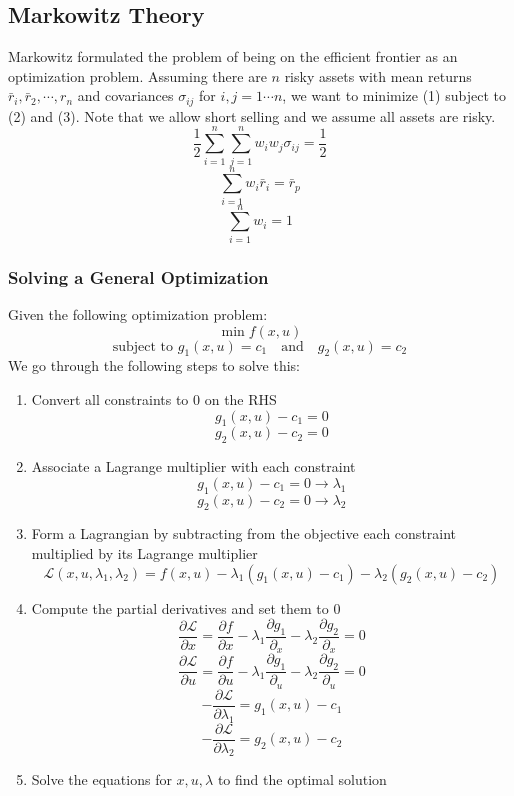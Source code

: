\documentclass[11pt]{article}
\newcommand{\Lagr}{\mathcal{L}}
\begin{document}
\subsection{Markowitz Theory}
Markowitz formulated the problem of being on the efficient frontier as an optimization problem. Assuming there are $n$ risky assets with mean returns $\bar{r}_i, \bar{r}_2, \cdots, r_n$ and covariances $\sigma_{ij}$ for $i,j = 1 \cdots n$, we want to minimize (1) subject to (2) and (3). Note that  we allow short selling and we assume all assets are risky.
\begin{equation}
 \frac{1}{2} \sum_{i=1}^n \sum_{j=1}^n w_iw_j \sigma_{ij} = \frac{1}{2}
\end{equation}
\begin{equation}
 \sum_{i=1}^n w_i\bar{r}_i = \bar{r}_p 
\end{equation}
\begin{equation}
 \sum_{i=1}^n w_i =1 
\end{equation}
\pagebreak
\subsubsection{Solving a General Optimization}
Given the following optimization problem:
$$ \min f(x,u)$$
$$ \text{subject to } g_1(x,u) = c_1 \quad \text{and} \quad g_2(x,u) = c_2 $$ 
We go through the following steps to solve this:
\begin{enumerate}
\item Convert all constraints to 0 on the RHS
$$ g_1(x,u) - c_1  = 0$$
$$ g_2(x,u) - c_2 = 0$$
\item Associate a Lagrange multiplier with each constraint
$$ g_1(x,u) - c_1  = 0 \rightarrow \lambda_1$$
$$ g_2(x,u) - c_2 = 0 \rightarrow \lambda_2$$
\item Form a Lagrangian by subtracting from the objective each constraint multiplied by its Lagrange multiplier
$$ \Lagr(x, u,\lambda_1, \lambda_2) = f(x,u) - \lambda_1(g_1(x,u) - c_1) - \lambda_2(g_2(x,u) - c_2)$$
\item Compute the partial derivatives and set them to 0
$$ \frac{\partial \Lagr}{\partial x} = \frac{\partial f}{\partial x } - \lambda_1 \frac{\partial g_1}{\partial _x} - \lambda_2 \frac{\partial g_2}{\partial _x} = 0$$
$$ \frac{\partial \Lagr}{\partial u} = \frac{\partial f}{\partial u } - \lambda_1 \frac{\partial g_1}{\partial _u} - \lambda_2 \frac{\partial g_2}{\partial _u} = 0$$
$$ -\frac{\partial \Lagr}{\partial \lambda_1} = g_1(x,u) - c_1$$
$$ -\frac{\partial \Lagr}{\partial \lambda_2} = g_2(x,u) - c_2$$
\item Solve the equations for $x, u, \lambda$ to find the optimal solution
\end{enumerate}
\end{document}
